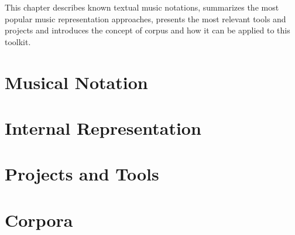 This chapter describes known textual music notations, summarizes the most popular music
representation approaches, presents the most relevant \abc{} tools and projects and introduces the
concept of corpus and how it can be applied to this toolkit.

\section{Musical Notation}


\section{Internal Representation}


\section{Projects and Tools}
\label{sec:projects}


\section{Corpora}

